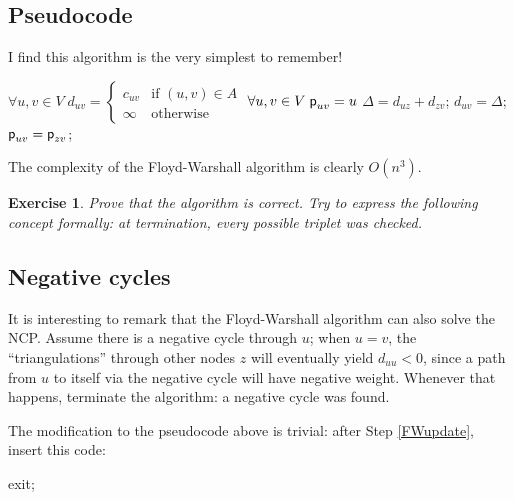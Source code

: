 \documentclass[a4paper]{book}
\theoremstyle{changebreak}                %
\newtheorem{ex}[result]{Exercise}
\begin{document}
\subsection{Pseudocode}
I find this algorithm is the very simplest to remember!
\begin{algorithmic}[1]
\STATE $\forall u,v\in
V\;d_{uv}=\left\{\begin{array}{rl}c_{uv}&\mbox{if }(u,v)\in
A\\ \infty & \mbox{otherwise} \end{array}\right.$
\STATE $\forall u,v\in V\;\mbox{\sf p}_{uv}=u$ 
      \STATE $\Delta=d_{uz}+d_{zv}$; \label{FWupdate}
         \STATE $d_{uv} = \Delta$; 
         \STATE $\mbox{\sf p}_{uv} = \mbox{\sf p}_{zv}$; 
      \ENDIF
    \ENDFOR
  \ENDFOR
\ENDFOR
\end{algorithmic}

The complexity of the Floyd-Warshall algorithm is clearly $O(n^3)$.

\begin{ex}
Prove that the algorithm is correct. Try to express the following
concept formally: {\it at termination, every possible triplet was
  checked}.
\end{ex}

\subsection{Negative cycles}
\label{s:path:negcycle}
It is interesting to remark that the Floyd-Warshall algorithm can also
solve the NCP. Assume there is a negative cycle through
$u$; when $u=v$, the ``triangulations'' through other nodes $z$ will
eventually yield $d_{uu}<0$, since a path from $u$ to itself via the
negative cycle will have negative weight. Whenever that happens,
terminate the algorithm: a negative cycle was found.

The modification to the pseudocode above is trivial: after Step
\ref{FWupdate}, insert this code:
\begin{algorithmic}
  \STATE exit;
\ENDIF
\end{algorithmic}



\end{document}

